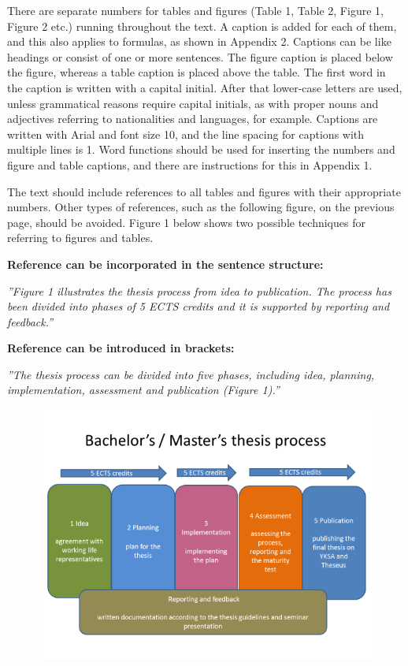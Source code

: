 \documentclass[12pt]{article}
\begin{document}
There are separate numbers for tables and figures (Table 1, Table 2, Figure 1, Figure 2 etc.) running throughout the text. A caption is added for each of them, and this also applies to formulas, as shown in Appendix 2. Captions can be like headings or consist of one or more sentences. The figure caption is placed below the figure, whereas a table caption is placed above the table. The first word in the caption is written with a capital initial. After that lower-case letters are used, unless grammatical reasons require capital initials, as with proper nouns and adjectives referring to nationalities and languages, for example. Captions are written with Arial and font size 10, and the line spacing for captions with multiple lines is 1. Word functions should be used for inserting the numbers and figure and table captions, and there are instructions for this in Appendix 1.

The text should include references to all tables and figures with their appropriate numbers. Other types of references, such as the following figure, on the previous page, should be avoided. Figure 1 below shows two possible techniques for referring to figures and tables.

\textbf{Reference can be incorporated in the sentence structure:}

\textit{”Figure 1 illustrates the thesis process from idea to publication. The process has been divided into phases of 5 ECTS credits and it is supported by reporting and feedback.”}

\textbf{Reference can be introduced in brackets:}

\textit{”The thesis process can be divided into five phases, including idea, planning, implementation, assessment and publication (Figure 1).”}

\begin{figure}
	\includegraphics{Figure1.png}
\end{figure}
\end{document}
